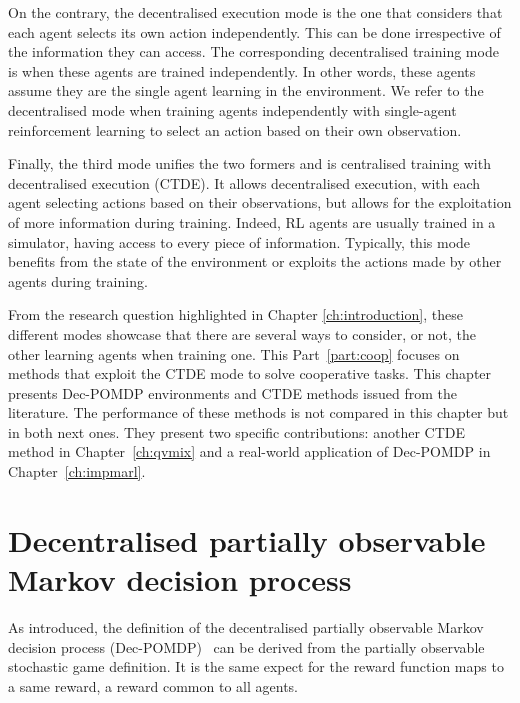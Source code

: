 On the contrary, the decentralised execution mode is the one that considers that each agent selects its own action independently.
This can be done irrespective of the information they can access.
The corresponding decentralised training mode is when these agents are trained independently.
In other words, these agents assume they are the single agent learning in the environment.
We refer to the decentralised mode when training agents independently with single-agent reinforcement learning to select an action based on their own observation.

Finally, the third mode unifies the two formers and is centralised training with decentralised execution (CTDE).
It allows decentralised execution, with each agent selecting actions based on their observations, but allows for the exploitation of more information during training.
Indeed, RL agents are usually trained in a simulator, having access to every piece of information.
Typically, this mode benefits from the state of the environment or exploits the actions made by other agents during training.

From the research question highlighted in Chapter \ref{ch:introduction}, these different modes showcase that there are several ways to consider, or not, the other learning agents when training one.
This Part~\ref{part:coop} focuses on methods that exploit the CTDE mode to solve cooperative tasks.
This chapter presents Dec-POMDP environments and CTDE methods issued from the literature.
The performance of these methods is not compared in this chapter but in both next ones.
They present two specific contributions: another CTDE method in Chapter~\ref{ch:qvmix} and a real-world application of Dec-POMDP in Chapter~\ref{ch:impmarl}.

\section{Decentralised partially observable Markov decision process}
\label{sec:ch3_decpomdp}
As introduced, the definition of the decentralised partially observable Markov decision process (Dec-POMDP)~\citep{DecPomdp} can be derived from the partially observable stochastic game definition.
It is the same expect for the reward function maps to a same reward, a reward common to all agents.

